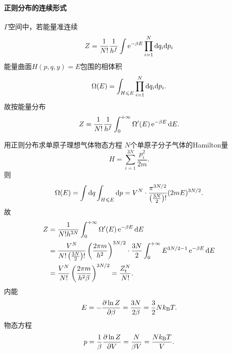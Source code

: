 \paragraph*{正则分布的连续形式}$\varGamma$空间中，若能量准连续
\begin{align}
	Z=\frac1{N!}\frac1{h^f}\int\mathop{}\!\mathrm{e}^{-\beta E}\prod_{i=1}^N\mathop{}\!\mathrm{d} q_i\mathrm{d} p_i
\end{align}
能量曲面$H(p,q,y)=E$包围的相体积
\begin{align}
	\Omega(E)=\int_{H\leqslant E}\prod_{i=1}^N\mathop{}\!\mathrm{d} q_i\mathrm{d} p_i.
\end{align}
故按能量分布
\begin{align}
	Z=\frac1{N!}\frac1{h^f}\int_0^{+\infty}\Omega'(E)\mathop{}\!\mathrm{e}^{-\beta E}\mathop{}\!\mathrm{d} E.
\end{align}
\begin{example}{用正则分布求单原子理想气体物态方程}{}
	$N$个单原子分子气体的Hamilton量
	\[
		H=\sum_{i=1}^{3N}\frac{p_i^2}{2m}.
	\]
	则
	\[
		\Omega(E)=\int\mathop{}\!\mathrm{d} q\int_{H\leqslant E}\mathop{}\!\mathrm{d} p=V^N\cdot\frac{\pi^{3N/2}}{\left(\frac{3N}2\right)!}(2mE)^{3N/2}.
	\]
	故
	\begin{align*}
		Z&=\frac1{N!h^{3N}}\int\zti\Omega'(E)\e{-\beta E}\d E\\
		&=\frac{V^N}{N!\kh{\frac{3N}2}!}\kh{\frac{2\pi m}{h^2}}^{3N/2}\cdot\frac{3N}2\int\zti E^{3N/2-1}\e{-\beta E}\d E\\
		&%
		=\frac{V^N}{N!}\kh{\frac{2\pi m}{h^2\beta}}^{3N/2}=\frac{Z_\tl^N}{N!}.
	\end{align*}
	内能
	\begin{align}
		E=-\frac{\partial^{\;\!\!}\ln Z}{\partial \beta^{\;\!\!}}=\frac{3N}{2\beta}=\frac32Nk_{\mathrm B} T.
	\end{align}
	物态方程
	\begin{align}
		p=\frac1\beta\frac{\partial^{\;\!\!}\ln Z}{\partial V^{\;\!\!}}=\frac N{\beta V}=\frac{Nk_{\mathrm B} T}V.
	\end{align}
\end{example}
